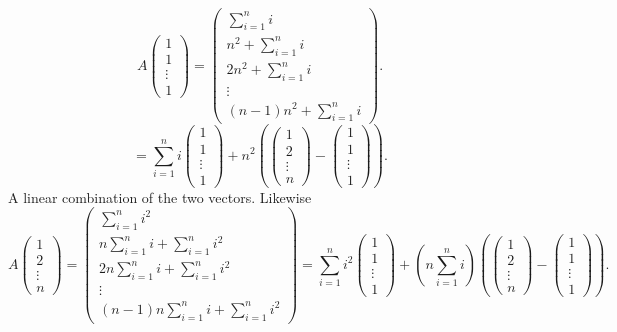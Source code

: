 \documentclass{article}
\begin{document}
     \[
     A \begin{pmatrix} 1 \\ 1 \\ \vdots \\ 1 \end{pmatrix} = \begin{pmatrix} \sum_{i=1}^{n}i \\ n^2 + \sum_{i=1}^{n}i \\ 2n^2 + \sum_{i=1}^{n}i \\  \vdots \\ (n-1)n^2 + \sum_{i=1}^{n}i \end{pmatrix} 
     .\] 
     \[
     = \sum_{i=1}^{n}i\begin{pmatrix} 1 \\ 1 \\ \vdots \\ 1 \end{pmatrix}  + n^2(\begin{pmatrix} 1 \\ 2 \\ \vdots \\ n \end{pmatrix}  - \begin{pmatrix} 1 \\ 1 \\ \vdots \\ 1 \end{pmatrix} )
     .\] 
     A linear combination of the two vectors. Likewise
     \[
     A \begin{pmatrix} 1 \\ 2 \\ \vdots \\ n \end{pmatrix}  = \begin{pmatrix} \sum_{i=1}^{n}i^2 \\ n\sum_{i=1}^{n}i + \sum_{i=1}^{n}i^2 \\ 2n\sum_{i=1}^{n}i + \sum_{i=1}^{n}i^2 \\ \vdots \\ (n-1)n\sum_{i=1}^{n}i + \sum_{i=1}^{n}i^2 \end{pmatrix}  = \sum_{i=1}^{n}i^2 \begin{pmatrix} 1 \\ 1 \\ \vdots \\ 1 \end{pmatrix} 
     + (n\sum_{i=1}^{n}i) (\begin{pmatrix} 1 \\ 2 \\ \vdots \\ n \end{pmatrix} - \begin{pmatrix} 1 \\ 1 \\ \vdots \\ 1 \end{pmatrix} )
     .\] 
\end{document}
